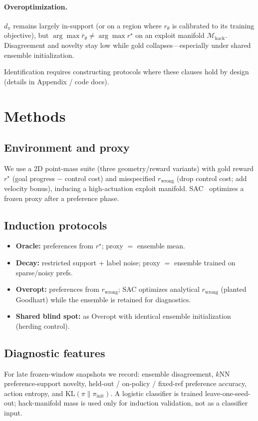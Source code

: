\documentclass{article}
\begin{document}
\paragraph{Overoptimization.}
$d_\pi$ remains largely in-support (or on a region where $r_\theta$ is calibrated to its training objective), but $\arg\max \bar r_\theta \neq \arg\max r^\star$ on an exploit manifold $\mathcal{M}_{\mathrm{hack}}$.
Disagreement and novelty stay low while gold collapses---especially under shared ensemble initialization.

Identification requires constructing protocols where these clauses hold by design (details in Appendix / code docs).

\section{Methods}
\subsection{Environment and proxy}
We use a 2D point-mass suite (three geometry/reward variants) with gold reward $r^\star$ (goal progress $-$ control cost) and misspecified $r_{\mathrm{wrong}}$ (drop control cost; add velocity bonus), inducing a high-actuation exploit manifold.
SAC~\citep{haarnoja2018sac} optimizes a frozen proxy after a preference phase.

\subsection{Induction protocols}
\begin{itemize}[leftmargin=*]
  \item \textbf{Oracle:} preferences from $r^\star$; proxy $=$ ensemble mean.
  \item \textbf{Decay:} restricted support + label noise; proxy $=$ ensemble trained on sparse/noisy prefs.
  \item \textbf{Overopt:} preferences from $r_{\mathrm{wrong}}$; SAC optimizes analytical $r_{\mathrm{wrong}}$ (planted Goodhart) while the ensemble is retained for diagnostics.
  \item \textbf{Shared blind spot:} as Overopt with identical ensemble initialization (herding control).
\end{itemize}

\subsection{Diagnostic features}
For late frozen-window snapshots we record:
ensemble disagreement, $k$NN preference-support novelty, held-out / on-policy / fixed-ref preference accuracy, action entropy, and $\mathrm{KL}(\pi\|\pi_{\mathrm{init}})$.
A logistic classifier is trained leave-one-seed-out; hack-manifold mass is used only for induction validation, not as a classifier input.
\end{document}

